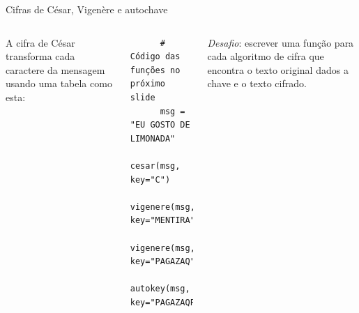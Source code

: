 \documentclass[utf8]{beamer}
\begin{document}
\begin{frame}[fragile]{Cifras de César, Vigenère e autochave}
\begin{columns}[c]
    A cifra de César transforma cada caractere da mensagem
    usando uma tabela como esta:
    \vspace{.5em}\vfill
    \vfill
    \begin{verbatim}
      # Código das funções no próximo slide
      msg = "EU GOSTO DE LIMONADA"
      cesar(msg, key="C")
      vigenere(msg, key="MENTIRA")
      vigenere(msg, key="PAGAZAQ")
      autokey(msg, key="PAGAZAQP")
    \end{verbatim}
    \vfill
    \emph{Desafio}: escrever uma função para cada algoritmo de cifra
                    que encontra o texto original
                    dados a chave e o texto cifrado.
  \end{columns}
\end{frame}
\end{document}
